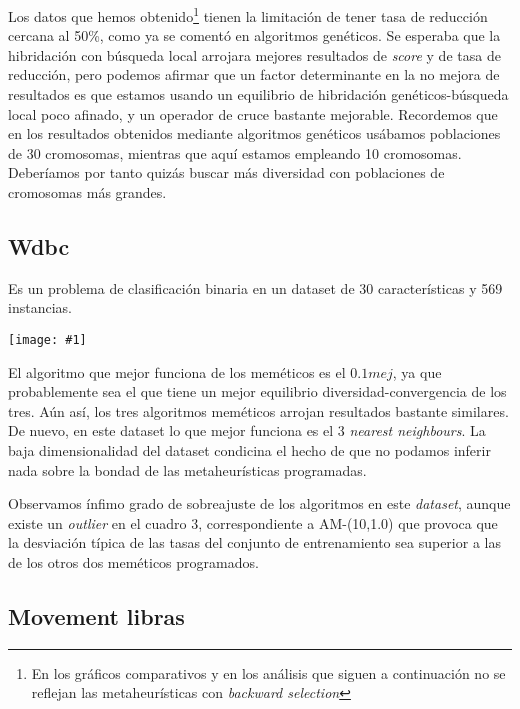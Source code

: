 \documentclass[a4paper,11pt]{article}
\newcommand{\imagen}[4]{
  \begin{minipage}{\linewidth}
    \centering
    \texttt{[image: \#1]}
    \captionof{figure}{#2}
    \label{#3}
  \end{minipage} 
}
\newcommand{\imgn}[3]{
  \begin{minipage}{\linewidth}
    \centering
    \texttt{[image: \#1]}
    \captionof{figure}{#2}
  \end{minipage} 
}
\begin{document}
  Los datos que hemos obtenido\footnote{En los gráficos comparativos y en los análisis que siguen a continuación
  no se reflejan las metaheurísticas con \textit{backward selection}}
  tienen la limitación de tener tasa de reducción cercana al 50\%, como ya se comentó en algoritmos
  genéticos. Se esperaba que la hibridación con búsqueda local arrojara mejores resultados de \textit{score} y de tasa de reducción,
  pero podemos afirmar que un factor determinante en la no mejora de resultados es que estamos usando un equilibrio de hibridación
  genéticos-búsqueda local poco afinado, y un operador de cruce bastante mejorable. Recordemos que en los resultados 
  obtenidos mediante algoritmos genéticos usábamos poblaciones de 30 cromosomas, mientras que aquí estamos empleando 
  10 cromosomas. Deberíamos por tanto quizás buscar más diversidad con poblaciones de cromosomas más grandes.
  
 
  \subsection{Wdbc}
  
  Es un problema de clasificación binaria en un dataset de 30 características y 569 instancias.
  
  \imagen{../data/memetic/wdbc.png}{Tasas de clasificación en Wdbc}{wdbcgraph}{0.7}
  
  
  El algoritmo que mejor funciona de los meméticos es el $0.1mej$, ya que probablemente sea el que tiene un mejor equilibrio
  diversidad-convergencia de los tres. Aún así, los tres algoritmos meméticos arrojan resultados bastante similares. De nuevo,
  en este dataset lo que mejor funciona es el 3 \textit{nearest neighbours}. La baja dimensionalidad del dataset condicina el
  hecho de que no podamos inferir nada sobre la bondad de las metaheurísticas programadas.
  
  Observamos ínfimo grado de sobreajuste de los algoritmos en este \textit{dataset}, aunque existe un \textit{outlier} en el cuadro
  3, correspondiente a AM-(10,1.0) que provoca que la desviación típica de las tasas del conjunto de entrenamiento sea superior a 
  las de los otros dos meméticos programados.
  
 
  \subsection{Movement libras}
  
\end{document}
